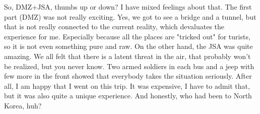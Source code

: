 \begin{post}
\begin{content}
So, DMZ+JSA, thumbs up or down? I have mixed feelings about that. The first part (DMZ) was not really exciting. Yes, we got to see a bridge and a tunnel, but that is not really connected to the current reality, which devaluates the experience for me. Especially because all the places are "tricked out" for turists, so it is not even something pure and raw. On the other hand, the JSA was quite amazing. We all felt that there is a latent threat in the air, that probably won't be realized, but you never know. Two armed soldiers in each bus and a jeep with few more in the front showed that everybody takes the situation seriously. After all, I am happy that I went on this trip. It was expensive, I have to admit that, but it was also quite a unique experience. And honestly, who had been to North Korea, huh?
	\end{content}
\end{post}
